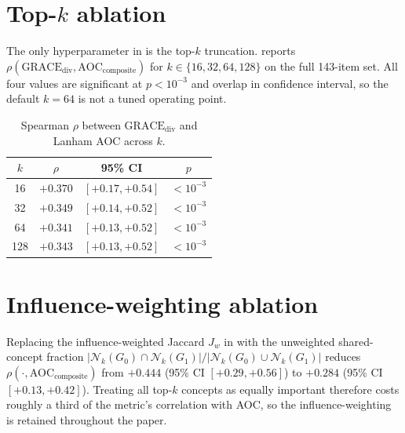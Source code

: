 \documentclass{article}
\newcommand{\gdiv}{\mathrm{GRACE}_{\text{div}}}
\newcommand{\Jw}{J_w}
\begin{document}



\appendix
\onecolumn

\section{Top-$k$ ablation}
\label{app:k}

The only hyperparameter in  is the top-$k$ truncation.
 reports
$\rho(\gdiv, \text{AOC}_{\text{composite}})$ for
$k \in \{16, 32, 64, 128\}$ on the full 143-item set. All four values
are significant at $p < 10^{-3}$ and overlap in confidence interval, so
the default $k = 64$ is not a tuned operating point.

\begin{table}[h]
\centering\small
\caption{Spearman $\rho$ between $\gdiv$ and Lanham AOC across $k$.}
\label{tab:ksweep}
\begin{tabular}{cccc}
\toprule
$k$ & $\rho$ & 95\% CI & $p$ \\
\midrule
16  & ${+}0.370$ & $[+0.17, +0.54]$ & ${<}10^{-3}$ \\
32  & ${+}0.349$ & $[+0.14, +0.52]$ & ${<}10^{-3}$ \\
64  & ${+}0.341$ & $[+0.13, +0.52]$ & ${<}10^{-3}$ \\
128 & ${+}0.343$ & $[+0.13, +0.52]$ & ${<}10^{-3}$ \\
\bottomrule
\end{tabular}
\end{table}

\section{Influence-weighting ablation}
\label{app:influence}

Replacing the influence-weighted Jaccard $\Jw$ in  with
the unweighted shared-concept fraction
$|\mathcal{N}_k(G_0) \cap \mathcal{N}_k(G_1)| /
 |\mathcal{N}_k(G_0) \cup \mathcal{N}_k(G_1)|$
reduces $\rho(\cdot, \text{AOC}_{\text{composite}})$ from
${+}0.444$ (95\% CI $[+0.29, +0.56]$) to ${+}0.284$
(95\% CI $[+0.13, +0.42]$). Treating all top-$k$ concepts as equally
important therefore costs roughly a third of the metric's correlation
with AOC, so the influence-weighting is retained throughout the paper.
\end{document}
